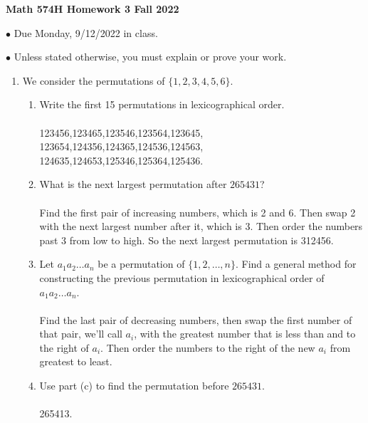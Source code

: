 \documentclass[12pt]{letter}
\begin{document}
\thispagestyle{empty}

\begin{center}
\textbf{Math 574H  \hfill Homework 3 \hfill Fall 2022} \\
\end{center}


$\bullet$ Due Monday, 9/12/2022 in class.

$\bullet$ Unless stated otherwise, you must explain or prove your work.

\noindent

\medskip 

\begin{enumerate}


\item We consider the permutations of $\{1,2,3,4,5,6\}$.
\begin{enumerate}
\item Write the first 15 permutations in lexicographical order.\\\\
123456,123465,123546,123564,123645,\\
123654,124356,124365,124536,124563,\\
124635,124653,125346,125364,125436.
\item What is the next largest permutation after $265431$?\\\\
Find the first pair of increasing numbers, which is 2 and 6. Then swap 2 with the next largest number after it, which is 3. Then order the numbers past 3 from low to high. So the next largest permutation is 312456.
\item Let $a_1 a_2 \ldots a_n$ be a permutation of $\{1, 2, \ldots, n\}$. Find a general method for constructing the previous permutation in lexicographical order of $a_1a_2 \ldots a_n$.\\\\
Find the last pair of decreasing numbers, then swap the first number of that pair, we'll call $a_i$, with the greatest number that is less than and to the right of $a_i$. Then order the numbers to the right of the new $a_i$ from greatest to least.
\item Use part (c) to find the permutation before $265431$.\\\\
265413.
\end{enumerate}

\medskip


\end{enumerate}
\end{document}
